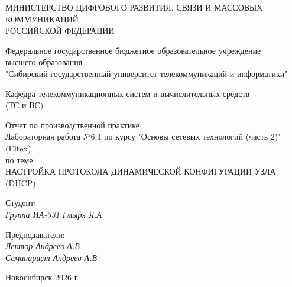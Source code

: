 \thispagestyle{empty}

\begin{center}
    МИНИСТЕРСТВО ЦИФРОВОГО РАЗВИТИЯ, СВЯЗИ И МАССОВЫХ КОММУНИКАЦИЙ \\ РОССИЙСКОЙ ФЕДЕРАЦИИ

    \vspace{20pt}

    Федеральное государственное бюджетное образовательное учреждение  \\  высшего образования \\
    "Сибирский государственный университет телекоммуникаций и информатики" \\

    \vspace{20pt}

    Кафедра телекоммуникационных систем и вычислительных средств \\  (ТС и ВС)
\end{center}

\vfill

\begin{center}
    Отчет по производственной практике \\  
    Лабораторная работа №6.1 по курсу "Основы сетевых технологий (часть 2)" (Eltex) \\
    \vspace{20pt}
    по теме: \\
    \uppercase{Настройка протокола динамической конфигурации узла (DHCP)}
\end{center}

\vfill

    \noindent Студент: \\
    \textit{Группа ИА-331 \hfill Гмыря Я.А} 

    \vspace{20pt}
 
    \noindent Предподаватели: \\
    \textit{Лектор \hfill Андреев А.В} \\
    \textit{Семинарист \hfill Андреев А.В}

\vfill

\begin{center}
    Новосибирск 2026 г.
\end{center}